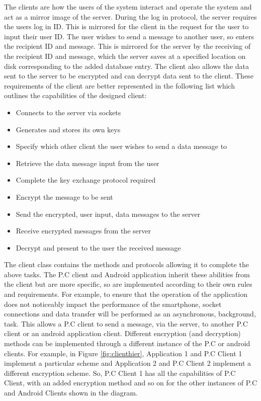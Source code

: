 \documentclass[a4paper,12pt]{report}
\begin{document}
The clients are how the users of the system interact and operate the system and act as a mirror image of the server. During the log in protocol, the server requires the users log in ID. This is mirrored for the client in the request for the user to input their user ID. The user wishes to send a message to another user, so enters the recipient ID and message. This is mirrored for the server by the receiving of the recipient ID and message, which the server saves at a specified location on disk corresponding to the added database entry. The client also allows the data sent to the server to be encrypted and can decrypt data sent to the client. These requirements of the client are better represented in the following list which outlines the capabilities of the designed client:

\begin{itemize}
 \item Connects to the server via sockets
 \item Generates and stores its own keys
 \item Specify which other client the user wishes to send a data message to
 \item Retrieve the data message input from the user
 \item Complete the key exchange protocol required
 \item Encrypt the message to be sent
 \item Send the encrypted, user input, data messages to the server
 \item Receive encrypted messages from the server
 \item Decrypt and present to the user the received message
\end{itemize}

The client class contains the methods and protocols allowing it to complete the above tasks. The P.C client and Android application inherit these abilities from the client but are more specific, so are implemented according to their own rules and requirements. For example, to ensure that the operation of the application does not noticeably impact the performance of the smartphone, socket connections and data transfer will be performed as an asynchronous, background, task. This allows a P.C client to send a message, via the server, to another P.C client or an android application client. Different encryption (and decryption) methods can be implemented through a different instance of the P.C or android clients. For example, in Figure \ref{fig:clienthier}, Application 1 and P.C Client 1 implement a particular scheme and Application 2 and P.C Client 2 implement a different encryption scheme. So, P.C Client 1 has all the capabilities of P.C Client, with an added encryption method and so on for the other instances of P.C and Android Clients shown in the diagram. 
\end{document}
